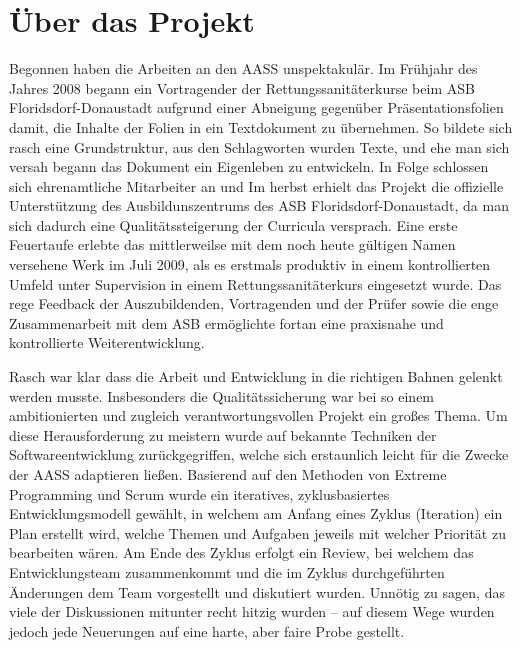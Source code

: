 \documentclass[
ngerman,
paper=a4,
asymmetric,
fontsize=10pt,
draft=false,
numbers=noenddot,
bibtotocnumbered,
footnotes=multiple,
toc=flat,
]{scrbook}
\begin{document}
\flushbottom

\maketitle


\tableofcontents




\chapter{Über das Projekt}

Begonnen haben die Arbeiten an den AASS unspektakulär. Im Frühjahr des Jahres 2008 begann ein Vortragender der Rettungssanitäterkurse beim ASB Floridsdorf-Donaustadt aufgrund einer Abneigung gegenüber Präsentationsfolien damit, die Inhalte der Folien in ein Textdokument zu übernehmen. So bildete sich rasch eine Grundstruktur, aus den Schlagworten wurden Texte, und ehe man sich versah begann das Dokument ein Eigenleben zu entwickeln. In Folge schlossen sich ehrenamtliche Mitarbeiter an und Im herbst erhielt das Projekt die offizielle Unterstützung des Ausbildunszentrums des ASB Floridsdorf-Donaustadt, da man sich dadurch eine Qualitätssteigerung der Curricula versprach. Eine erste Feuertaufe erlebte das mittlerweilse mit dem noch heute gültigen Namen versehene Werk im Juli 2009, als es erstmals produktiv in einem kontrollierten Umfeld unter Supervision in einem Rettungssanitäterkurs eingesetzt wurde. Das rege Feedback der Auszubildenden, Vortragenden und der Prüfer sowie die enge Zusammenarbeit mit dem ASB ermöglichte fortan eine praxisnahe und kontrollierte Weiterentwicklung. 


Rasch war klar dass die Arbeit und Entwicklung in die richtigen Bahnen gelenkt werden musste. Insbesonders die Qualitätssicherung war bei so einem ambitionierten und zugleich verantwortungsvollen Projekt ein großes Thema. Um diese Herausforderung zu meistern wurde auf bekannte Techniken der Softwareentwicklung zurückgegriffen, welche sich erstaunlich leicht für die Zwecke der AASS adaptieren ließen. Basierend auf den Methoden von Extreme Programming und Scrum wurde ein iteratives, zyklusbasiertes Entwicklungsmodell gewählt, in welchem am Anfang eines Zyklus (Iteration) ein Plan erstellt wird, welche Themen und Aufgaben jeweils mit welcher Priorität zu bearbeiten wären. Am Ende des Zyklus erfolgt ein Review, bei welchem das Entwicklungsteam zusammenkommt und die im Zyklus durchgeführten Änderungen dem Team vorgestellt und diskutiert wurden. Unnötig zu sagen, das viele der Diskussionen mitunter recht hitzig wurden -- auf diesem Wege wurden jedoch jede Neuerungen auf eine harte, aber faire Probe gestellt.
\end{document}
